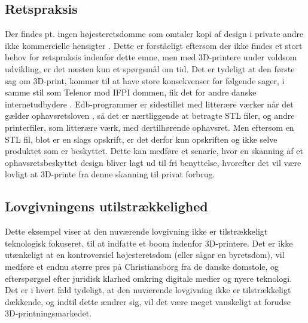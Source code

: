 \subsection{Retspraksis}

Der findes pt. ingen højesteretsdomme som omtaler kopi af design i private andre ikke kommercielle hensigter \cite{jura5}. Dette er forståeligt eftersom der ikke findes et stort behov for retspraksis indenfor dette emne, men med 3D-printere under voldsom udvikling, er det næsten kun et spørgsmål om tid. Det er tydeligt at den første sag om 3D-print, kommer til at have store konsekvenser for følgende sager, i samme stil som Telenor mod IFPI dommen, fik det for andre danske internetudbydere \cite{jura6}.
Edb-programmer er sidestillet med litterære værker når det gælder ophavsretsloven \cite{jura7}, så det er nærtliggende at betragte STL filer, og andre printerfiler, som litterære værk, med dertilhørende ophavsret. Men eftersom en STL fil, blot er en slags opskrift, er det derfor kun opskriften og ikke selve produktet som er beskyttet. Dette kan medføre et senarie, hvor en skanning af et ophavsretsbeskyttet design bliver lagt ud til fri benyttelse, hvorefter det vil være lovligt at 3D-printe fra denne skanning til privat forbrug.

\subsection{Lovgivningens utilstrækkelighed}
 
Dette eksempel viser at den nuværende lovgivning ikke er tilstrækkeligt teknologisk fokuseret, til at indfatte et boom indenfor 3D-printere. Det er ikke utænkeligt at en kontroversiel højesteretsdom (eller sågar en byretsdom), vil medføre et endnu større pres på Christiansborg fra de danske domstole, og efterspørgsel efter juridisk klarhed omkring digitale medier og nyere teknologi.
Det er i hvert fald tydeligt, at den nuværende lovgivning ikke er tilstrækkeligt dækkende, og indtil dette ændrer sig, vil det være meget vanskeligt at forudse 3D-printningsmarkedet.
